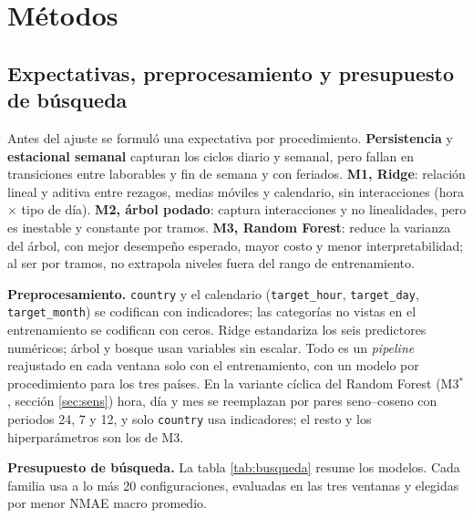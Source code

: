 \section{Métodos}

\subsection{Expectativas, preprocesamiento y presupuesto de búsqueda}

Antes del ajuste se formuló una expectativa por procedimiento. \textbf{Persistencia} y \textbf{estacional semanal} capturan los ciclos diario y semanal, pero fallan en transiciones entre laborables y fin de semana y con feriados. \textbf{M1, Ridge}: relación lineal y aditiva entre rezagos, medias móviles y calendario, sin interacciones (hora $\times$ tipo de día). \textbf{M2, árbol podado}: captura interacciones y no linealidades, pero es inestable y constante por tramos. \textbf{M3, Random Forest}: reduce la varianza del árbol, con mejor desempeño esperado, mayor costo y menor interpretabilidad; al ser por tramos, no extrapola niveles fuera del rango de entrenamiento.

\textbf{Preprocesamiento.} \texttt{country} y el calendario (\texttt{target\_hour}, \texttt{target\_day}, \texttt{target\_month}) se codifican con indicadores; las categorías no vistas en el entrenamiento se codifican con ceros. Ridge estandariza los seis predictores numéricos; árbol y bosque usan variables sin escalar. Todo es un \textit{pipeline} reajustado en cada ventana solo con el entrenamiento, con un modelo por procedimiento para los tres países. En la variante cíclica del Random Forest (M3$^\ast$, sección \ref{sec:sens}) hora, día y mes se reemplazan por pares seno--coseno con periodos 24, 7 y 12, y solo \texttt{country} usa indicadores; el resto y los hiperparámetros son los de M3.

\textbf{Presupuesto de búsqueda.} La tabla \ref{tab:busqueda} resume los modelos. Cada familia usa a lo más 20 configuraciones, evaluadas en las tres ventanas y elegidas por menor NMAE macro promedio.

